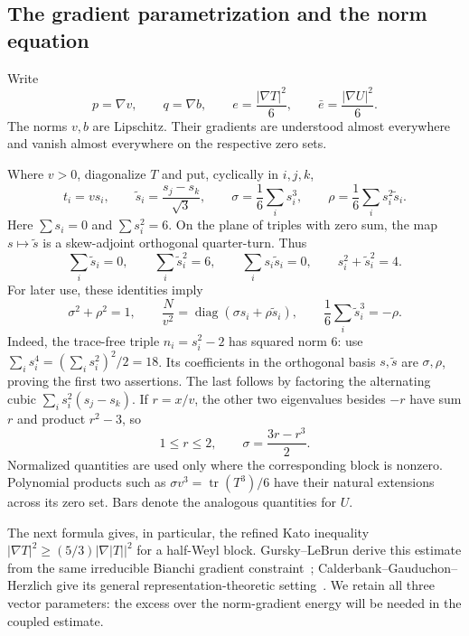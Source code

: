 \subsection{The gradient parametrization and the norm equation}

Write
\[
 p=\nabla v,\qquad q=\nabla b,\qquad
 e=\frac{|\nabla T|^2}{6},\qquad
 \bar e=\frac{|\nabla U|^2}{6}.
\]
The norms $v,b$ are Lipschitz. Their gradients are understood almost
everywhere and vanish almost everywhere on the respective zero sets.

Where $v>0$, diagonalize $T$ and put, cyclically in $i,j,k$,
\[
 t_i=vs_i,\qquad
 \widetilde s_i=\frac{s_j-s_k}{\sqrt3},\qquad
 \sigma=\frac16\sum_i s_i^3,\qquad
 \rho=\frac16\sum_i s_i^2\widetilde s_i.
\]
Here $\sum s_i=0$ and $\sum s_i^2=6$. On the plane of triples with
zero sum, the map $s\mapsto\widetilde s$ is a skew-adjoint orthogonal
quarter-turn. Thus
\[
 \sum_i\widetilde s_i=0,\qquad
 \sum_i\widetilde s_i^2=6,\qquad
 \sum_i s_i\widetilde s_i=0,\qquad
 s_i^2+\widetilde s_i^2=4.
\]
For later use, these identities imply
\[
 \sigma^2+\rho^2=1,\qquad
 \frac{N}{v^2}
   =\operatorname{diag}(\sigma s_i+\rho\widetilde s_i),
 \qquad
 \frac16\sum_i\widetilde s_i^3=-\rho.
\]
Indeed, the trace-free triple $n_i=s_i^2-2$ has squared norm $6$:
use $\sum_i s_i^4=(\sum_i s_i^2)^2/2=18$.
Its coefficients in the orthogonal basis $s,\widetilde s$ are
$\sigma,\rho$, proving the first two assertions. The last follows
by factoring the alternating cubic
$\sum_i s_i^2(s_j-s_k)$. If $r=x/v$, the other two eigenvalues
besides $-r$ have sum $r$ and product $r^2-3$, so
\[
 1\le r\le2,\qquad
 \sigma=\frac{3r-r^3}{2}.
\]
Normalized quantities are used only where the corresponding block
is nonzero. Polynomial products such as
$\sigma v^3=\operatorname{tr}(T^3)/6$ have their natural extensions
across its zero set. Bars denote the analogous quantities for $U$.

The next formula gives, in particular, the refined Kato inequality
$|\nabla T|^2\ge(5/3)|\nabla|T||^2$ for a half-Weyl block.
Gursky--LeBrun derive this estimate from the same irreducible Bianchi
gradient constraint~\cite[Lemma~4, equations~(10)--(12)]{GurskyLeBrun1999};
Calderbank--Gauduchon--Herzlich give its general representation-theoretic
setting~\cite[equation~(7.1)]{CalderbankGauduchonHerzlich2000}.
We retain all three vector parameters: the excess over the norm-gradient
energy will be needed in the coupled estimate.

